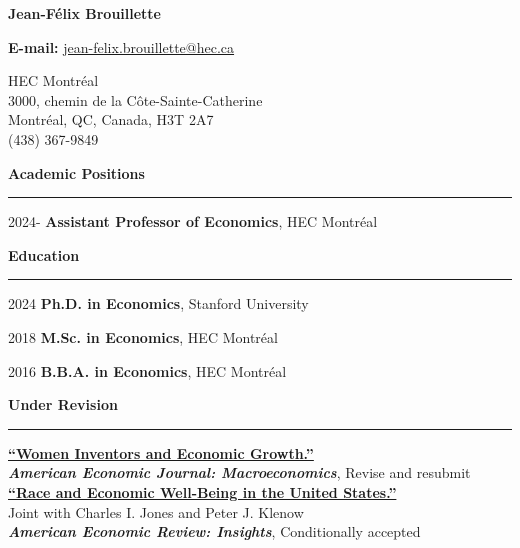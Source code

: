 \documentclass[12pt]{article}
\begin{document}
\begin{center}
{\huge \textbf{Jean-F\'elix Brouillette}} \\

\vspace{0.5cm}

\textbf{E-mail:} \href{mailto:jean-felix.brouillette@hec.ca}{jean-felix.brouillette@hec.ca} \\

\vspace{0.5cm}

\begin{small}
HEC Montr\'eal \\
3000, chemin de la C\^ote-Sainte-Catherine \\
Montr\'eal, QC, Canada, H3T 2A7 \\
(438) 367-9849
\end{small}
\end{center}

{\large \textbf{Academic Positions}} \\
\noindent\rule[0.5\baselineskip]{\textwidth}{1pt}

\begin{small}
2024- \tabto{1.5cm} \textbf{Assistant Professor of Economics}, HEC Montr\'eal
\end{small}

\vspace{0.5cm}

{\large \textbf{Education}} \\
\noindent\rule[0.5\baselineskip]{\textwidth}{1pt}

\begin{small}
2024 \tabto{1.5cm} \textbf{Ph.D. in Economics}, Stanford University

2018 \tabto{1.5cm} \textbf{M.Sc. in Economics}, HEC Montr\'eal

2016 \tabto{1.5cm} \textbf{B.B.A. in Economics}, HEC Montr\'eal
\end{small}

\vspace{0.5cm}

{\large \textbf{Under Revision}} \\
\noindent\rule[0.5\baselineskip]{\textwidth}{1pt}

\begin{small}
\href{https://jfbrou.github.io/papers/hopper.pdf}{\textbf{``Women Inventors and Economic Growth.''}} \\
\textit{\textbf{American Economic Journal: Macroeconomics}}, Revise and resubmit \\[-0.5\baselineskip]

\href{http://klenow.com/BrouilletteJonesKlenow_Race_and_Welfare.pdf}{\textbf{``Race and Economic Well-Being in the United States.''}} \\
Joint with Charles I. Jones and Peter J. Klenow \\
\textit{\textbf{American Economic Review: Insights}}, Conditionally accepted
\end{small}
\end{document}
